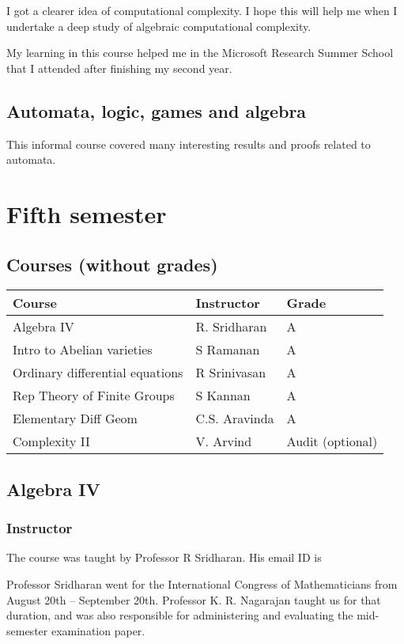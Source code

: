 \documentclass[a4paper]{amsart}
\begin{document}
I got a clearer idea of computational complexity. I hope this will help me when I undertake a deep study of algebraic computational complexity.

My learning in this course helped me in the Microsoft Research Summer School that I attended after finishing my second year.

\subsection{Automata, logic, games and algebra}

This informal course covered many interesting results and proofs related to automata. 

\section{Fifth semester}

\subsection{Courses (without grades)}

\begin{tabular}{|l|l|l|}
  \hline
  Course & Instructor & Grade\\
  \hline
  Algebra IV & R. Sridharan & A\\
  Intro to Abelian varieties & S Ramanan & A\\
  Ordinary differential equations & R Srinivasan & A\\
  Rep Theory of Finite Groups & S Kannan & A\\
  Elementary Diff Geom & C.S. Aravinda & A\\
  Complexity II & V. Arvind & Audit (optional) \\
  \hline
\end{tabular}

\subsection{Algebra IV}

\subsubsection{Instructor}

The course was taught by Professor R Sridharan. His email ID is 

Professor Sridharan went for the International Congress of
Mathematicians from August 20th -- September 20th.  Professor K. R.
Nagarajan taught us for that duration, and was also responsible for
administering and evaluating the mid-semester examination paper.
\end{document}
